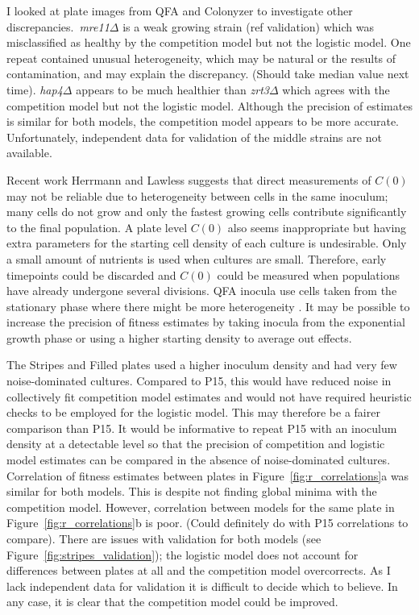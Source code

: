I looked at plate images from QFA and Colonyzer to investigate other
discrepancies.~\textit{mre11\(\Delta\)} is a weak growing strain (ref
validation) which was misclassified as healthy by the competition
model but not the logistic model. One repeat contained unusual
heterogeneity, which may be natural or the results of contamination,
and may explain the discrepancy. (Should take median value next
time). \textit{hap4\(\Delta\)} appears to be much healthier than
\textit{zrt3\(\Delta\)} which agrees with the competition model but
not the logistic model. Although the precision of estimates is similar
for both models, the competition model appears to be more
accurate. Unfortunately, independent data for validation of the middle
strains are not available.

Recent work Herrmann and Lawless suggests that direct measurements of
\(C(0)\) may not be reliable due to heterogeneity between cells in the
same inoculum; many cells do not grow and only the fastest growing
cells contribute significantly to the final population. A plate level
\(C(0)\) also seems inappropriate but having extra parameters for the
starting cell density of each culture is undesirable. Only a small
amount of nutrients is used when cultures are small. Therefore, early
timepoints could be discarded and \(C(0)\) could be measured when
populations have already undergone several divisions. QFA inocula use
cells taken from the stationary phase where there might be more
heterogeneity \citep{bergkessel2016}. It may be possible to increase
the precision of fitness estimates by taking inocula from the
exponential growth phase or using a higher starting density to average
out effects.

The Stripes and Filled plates used a higher inoculum density and had
very few noise-dominated cultures. Compared to P15, this would have
reduced noise in collectively fit competition model estimates and
would not have required heuristic checks to be employed for the
logistic model. This may therefore be a fairer comparison than P15. It
would be informative to repeat P15 with an inoculum density at a
detectable level so that the precision of competition and logistic
model estimates can be compared in the absence of noise-dominated
cultures. Correlation of fitness estimates between plates in
Figure~\ref{fig:r_correlations}a was similar for both models. This is
despite not finding global minima with the competition model. However,
correlation between models for the same plate in
Figure~\ref{fig:r_correlations}b is poor. (Could definitely do with
P15 correlations to compare). There are issues with validation for
both models (see Figure~\ref{fig:stripes_validation}); the logistic
model does not account for differences between plates at all and the
competition model overcorrects. As I lack independent data for
validation it is difficult to decide which to believe.
In any case, it is clear that the competition model could be improved.



